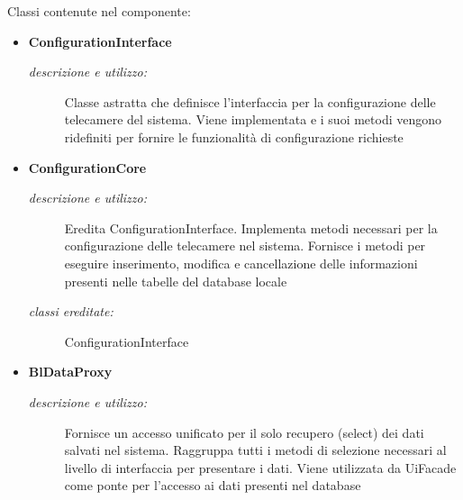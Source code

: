 Classi contenute nel componente: 
\begin{itemize} 
\item \textbf{ConfigurationInterface}
\begin{description}
\item [\textit{descrizione e utilizzo:}] Classe astratta che definisce l'interfaccia per la configurazione delle telecamere del sistema. Viene implementata e i suoi metodi vengono ridefiniti per fornire le funzionalità di configurazione richieste
\end{description}
\item \textbf{ConfigurationCore}
\begin{description}
\item [\textit{descrizione e utilizzo:}] Eredita ConfigurationInterface. Implementa metodi necessari per la configurazione delle telecamere nel sistema. Fornisce i metodi per eseguire inserimento, modifica e cancellazione delle informazioni presenti nelle tabelle del database locale
\item [\textit{classi ereditate:}] ConfigurationInterface
\end{description}
\item \textbf{BlDataProxy}
\begin{description}
\item [\textit{descrizione e utilizzo:}] Fornisce un accesso unificato per il solo recupero (select) dei dati salvati nel sistema. Raggruppa tutti i metodi di selezione necessari al livello di interfaccia per presentare i dati. Viene utilizzata da UiFacade come ponte per l'accesso ai dati presenti nel database
\end{description}
\end{itemize}

